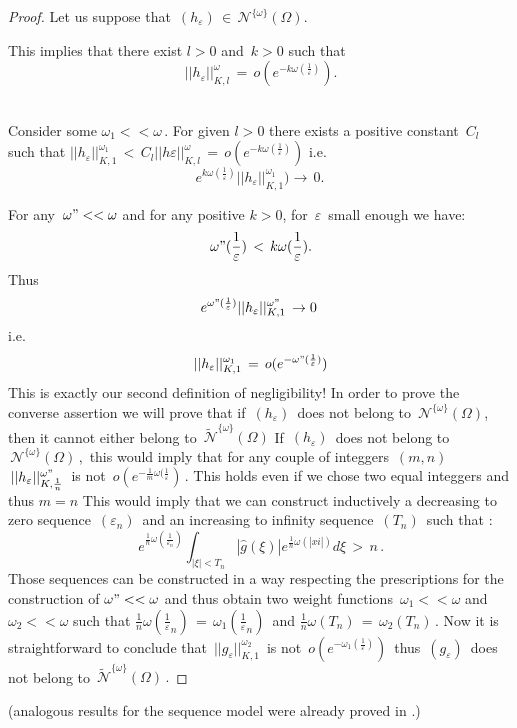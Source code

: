 \documentclass[12pt,a4paper]{amsart}
\begin{document}
\begin{proof}
  Let us suppose that
$\,(h_\varepsilon)\,\in\,\mathcal{N}^{\{\omega\}}(\Omega).$

This implies that there exist $l>0$ and $\, k>0$ such that 
$$\,||h_\varepsilon||_{K,l}^\omega\,=
\,o(e^{-k\omega(\frac{1}{\varepsilon})}).$$\

Consider some $\omega_1<<\omega\,.$
For given $l>0$ there exists a positive constant $\,C_l\,$
such that $ ||h_\varepsilon||_{K,1}^{\omega_1}\,<
\,C_l||h\varepsilon||_{K,l}^\omega\,=
\,o(e^{-k\omega(\frac{1}{\varepsilon})})$ i.e.
$$
e^{k\omega(\frac{1}{\varepsilon})}||h_\varepsilon||_{K,1}^{\omega_1})\rightarrow \,0.$$

For any $\,\omega"<<\omega$ and for any positive $k>0$, for $\,\varepsilon\,$ small enough we have:
$$\,\omega"(\frac{1}{\varepsilon})\,
<\,k\omega(\frac{1}{\varepsilon}).$$ Thus
$$e^{\omega"(\frac{1}{\varepsilon})}
||h_\varepsilon||_{K,1}^{\omega"}\,\rightarrow  0\,$$
i.e.
$$\,||h_\varepsilon||_{K,1}^{\omega_1}\,
=\,o(e^{-\omega"(\frac{1}{\varepsilon})})$$
This is exactly our second definition of negligibility!
  In order to prove the converse assertion  we will prove that if 
  $\,(h_\varepsilon)\,$ does not belong to 
  $\,\mathcal{N}^{\{\omega\}}(\Omega)$, then it cannot either belong to 
  $\,\tilde{\mathcal{N}}^{\{\omega\}}(\Omega)$
If  $\,(h_\varepsilon)\,$ does not belong to 
  $\,\mathcal{N}^{\{\omega\}}(\Omega)\,,$ this would imply that for any  couple of integgers $\,(m,n)\,$ 
  $\,||h_\varepsilon||_{K,\frac{1}{n}}^{\omega"}\,$ is not
  $\,o(e^{-\frac{1}{m}\omega(\frac{1}{\varepsilon}})\,.$
  This holds even if we chose two equal integgers  and thus $m = n$ This would imply that we can construct inductively a decreasing to zero sequence 
  $\,(\varepsilon_n)\,$ and an increasing to infinity sequence $\, (T_n)\,$ such that :
  $$\,e^{\frac{1}{n}\omega(\frac{1}{\varepsilon_n})}
  \int_{|\xi|<T_n}|\hat{g}(\xi)|e^{\frac{1}{n}\omega(|xi|)}d\xi\,>\,n\,.$$
  Those sequences can be constructed in a way respecting the prescriptions for the construction of $\omega"<<\omega$
  and thus obtain two weight functions 
  $\,\omega_1<<\omega$ and $\omega_2<<\omega$ 
  such that
  $\frac{1}{n}\omega(\frac{1}{\varepsilon}_n)\,=\,
  \omega_1(\frac{1}{\varepsilon}_n)\,$ and
  $ \frac{1}{n}\omega(T_n)\,=\,\omega_2(T_n)\,.$
 Now it is straightforward to conclude that 
 $\,||g_\varepsilon||_{K,1}^{\omega_2}\,$  is not 
$\,o(e^{-\omega_1(\frac{1}{\varepsilon})})\,$
thus $\,(g_\varepsilon)\, $ does not belong to 
$\,\tilde{\mathcal{N}}^{\{\omega\}}(\Omega)\,.$
\end{proof} 
(analogous results for the sequence model were already proved in 
 \cite{D.V.V.}.)
\end{document}
